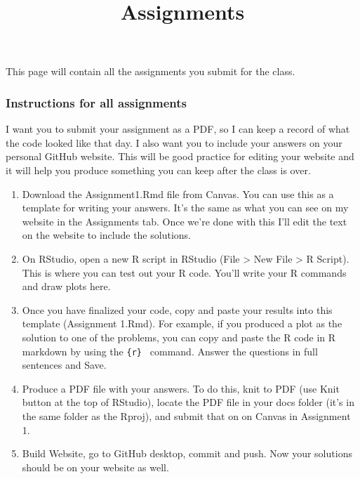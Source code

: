 \documentclass[
]{article}
\title{Assignments}
\author{}
\date{\vspace{-2.5em}}
\begin{document}
\maketitle

{
\setcounter{tocdepth}{1}
\tableofcontents
}
This page will contain all the assignments you submit for the class.

\hypertarget{instructions-for-all-assignments}{%
\subsubsection{Instructions for all
assignments}\label{instructions-for-all-assignments}}

I want you to submit your assignment as a PDF, so I can keep a record of
what the code looked like that day. I also want you to include your
answers on your personal GitHub website. This will be good practice for
editing your website and it will help you produce something you can keep
after the class is over.

\begin{enumerate}
\def\labelenumi{\arabic{enumi}.}
\item
  Download the Assignment1.Rmd file from Canvas. You can use this as a
  template for writing your answers. It's the same as what you can see
  on my website in the Assignments tab. Once we're done with this I'll
  edit the text on the website to include the solutions.
\item
  On RStudio, open a new R script in RStudio (File \textgreater{} New
  File \textgreater{} R Script). This is where you can test out your R
  code. You'll write your R commands and draw plots here.
\item
  Once you have finalized your code, copy and paste your results into
  this template (Assignment 1.Rmd). For example, if you produced a plot
  as the solution to one of the problems, you can copy and paste the R
  code in R markdown by using the
  \texttt{\textasciigrave{}\textasciigrave{}\{r\}\ \textasciigrave{}\textasciigrave{}\textasciigrave{}}
  command. Answer the questions in full sentences and Save.
\item
  Produce a PDF file with your answers. To do this, knit to PDF (use
  Knit button at the top of RStudio), locate the PDF file in your docs
  folder (it's in the same folder as the Rproj), and submit that on on
  Canvas in Assignment 1.
\item
  Build Website, go to GitHub desktop, commit and push. Now your
  solutions should be on your website as well.
\end{enumerate}
\end{document}
